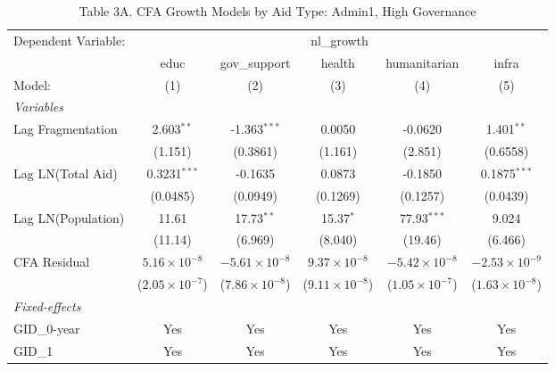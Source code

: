\begin{table}[H]
   \caption{Table 3A. CFA Growth Models by Aid Type: Admin1, High Governance}
   \centering
   \begin{tabular}{lccccc}
      \tabularnewline \midrule \midrule
      Dependent Variable: & \multicolumn{5}{c}{nl\_growth}\\
                         & educ                    & gov\_support            & health                  & humanitarian            & infra \\   
      Model:             & (1)                     & (2)                     & (3)                     & (4)                     & (5)\\  
      \midrule
      \emph{Variables}\\
      Lag Fragmentation  & 2.603$^{**}$            & -1.363$^{***}$          & 0.0050                  & -0.0620                 & 1.401$^{**}$\\   
                         & (1.151)                 & (0.3861)                & (1.161)                 & (2.851)                 & (0.6558)\\   
      Lag LN(Total Aid)  & 0.3231$^{***}$          & -0.1635                 & 0.0873                  & -0.1850                 & 0.1875$^{***}$\\   
                         & (0.0485)                & (0.0949)                & (0.1269)                & (0.1257)                & (0.0439)\\   
      Lag LN(Population) & 11.61                   & 17.73$^{**}$            & 15.37$^{*}$             & 77.93$^{***}$           & 9.024\\   
                         & (11.14)                 & (6.969)                 & (8.040)                 & (19.46)                 & (6.466)\\   
      CFA Residual       & $5.16\times 10^{-8}$    & $-5.61\times 10^{-8}$   & $9.37\times 10^{-8}$    & $-5.42\times 10^{-8}$   & $-2.53\times 10^{-9}$\\    
                         & ($2.05\times 10^{-7}$)  & ($7.86\times 10^{-8}$)  & ($9.11\times 10^{-8}$)  & ($1.05\times 10^{-7}$)  & ($1.63\times 10^{-8}$)\\    
      \midrule
      \emph{Fixed-effects}\\
      GID\_0-year        & Yes                     & Yes                     & Yes                     & Yes                     & Yes\\  
      GID\_1             & Yes                     & Yes                     & Yes                     & Yes                     & Yes\\  

\end{tabular}
\end{table}
